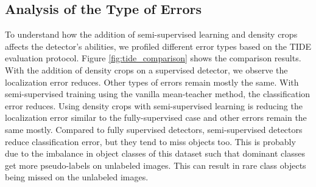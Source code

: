\begin{table}
    \caption{Comparison of the training and test time for fully supervised and semi-supervised methods with and without density crops. All settings are evaluated using one A100 GPU with the Visdrone dataset having 10\% labels.}
    \centering
    \label{table:cost_comparison}
\end{table}


\subsection{Analysis of the Type of Errors}
To understand how the addition of semi-supervised learning and density crops affects the detector's abilities, we profiled different error types based on the TIDE \cite{tide-Bolya-eccv2020} evaluation protocol. Figure \ref{fig:tide_comparison} shows the comparison results. With the addition of density crops on a supervised detector, we observe the localization error reduces. Other types of errors remain mostly the same. With semi-supervised training using the vanilla mean-teacher method, the classification error reduces. Using density crops with semi-supervised learning is reducing the localization error  similar to the fully-supervised case and other errors remain the same mostly. Compared to fully supervised detectors, semi-supervised detectors reduce classification error, but they tend to miss objects too. This is probably due to the imbalance in object classes of this dataset such that dominant classes get more pseudo-labels on unlabeled images. This can result in rare class objects being missed on the unlabeled images.


